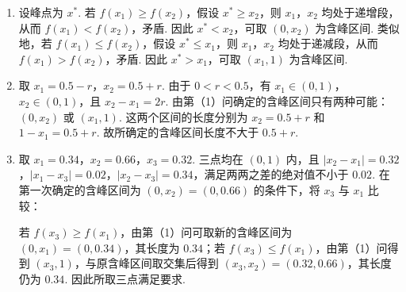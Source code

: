 \begin{solution}
\begin{enumerate}
\item 设峰点为 \(x^*\). 若 \(f(x_1)\geqslant f(x_2)\)，假设 \(x^*\geqslant x_2\)，则 \(x_1\)，\(x_2\) 均处于递增段，从而 \(f(x_1)<f(x_2)\)，矛盾. 因此 \(x^*<x_2\)，可取 \(\left(0,x_2\right)\) 为含峰区间. 类似地，若 \(f(x_1)\leqslant f(x_2)\)，假设 \(x^*\leqslant x_1\)，则 \(x_1\)，\(x_2\) 均处于递减段，从而 \(f(x_1)>f(x_2)\)，矛盾. 因此 \(x^*>x_1\)，可取 \(\left(x_1,1\right)\) 为含峰区间.

\item 取 \(x_1=0.5-r\)，\(x_2=0.5+r\). 由于 \(0<r<0.5\)，有 \(x_1\in(0,1)\)，\(x_2\in(0,1)\)，且 \(x_2-x_1=2r\). 由第（1）问确定的含峰区间只有两种可能：\(\left(0,x_2\right)\) 或 \(\left(x_1,1\right)\). 这两个区间的长度分别为 \(x_2=0.5+r\) 和 \(1-x_1=0.5+r\).
故所确定的含峰区间长度不大于 \(0.5+r\).

\item 取 \(x_1=0.34\)，\(x_2=0.66\)，\(x_3=0.32\). 三点均在 \((0,1)\) 内，且 \(|x_2-x_1|=0.32\)，\(|x_1-x_3|=0.02\)，\(|x_2-x_3|=0.34\)，满足两两之差的绝对值不小于 \(0.02\). 在第一次确定的含峰区间为 \(\left(0,x_2\right)=\left(0,0.66\right)\) 的条件下，将 \(x_3\) 与 \(x_1\) 比较：

若 \(f(x_3)\geqslant f(x_1)\)，由第（1）问可取新的含峰区间为 \(\left(0,x_1\right)=\left(0,0.34\right)\)，其长度为 \(0.34\)；若 \(f(x_3)\leqslant f(x_1)\)，由第（1）问得到 \(\left(x_3,1\right)\)，与原含峰区间取交集后得到 \(\left(x_3,x_2\right)=\left(0.32,0.66\right)\)，其长度仍为 \(0.34\). 因此所取三点满足要求.
\end{enumerate}
\end{solution}
